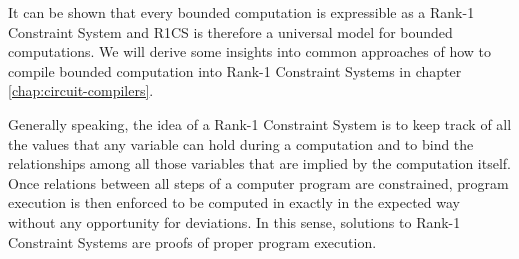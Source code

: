 It can be shown that every bounded computation is expressible as a Rank-1 Constraint System and R1CS is therefore a universal model for bounded computations. We will derive some insights into common approaches of how to compile bounded computation into Rank-1 Constraint Systems in chapter \ref{chap:circuit-compilers}. 

Generally speaking, the idea of a Rank-1 Constraint System is to keep track of all the values that any variable can hold during a computation and to bind the relationships among all those variables that are implied by the computation itself. Once relations between all steps of a computer program are constrained, program execution is then enforced to be computed in exactly in the expected way without any opportunity for deviations. In this sense, solutions to Rank-1 Constraint Systems are proofs of proper program execution.

